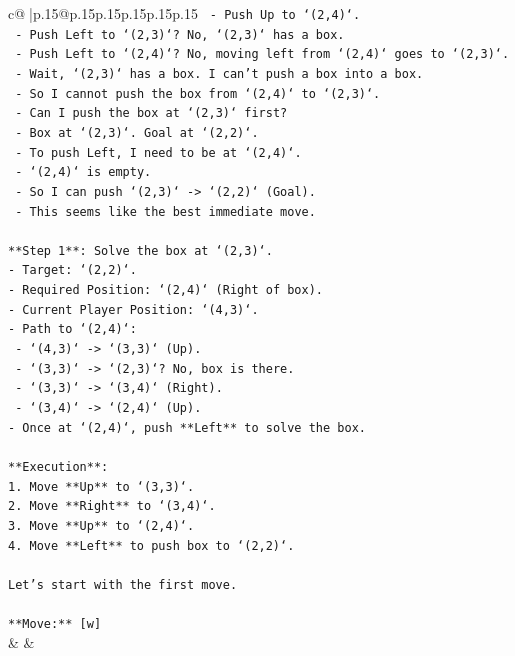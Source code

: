 \documentclass{article}
\begin{document}
{\begin{supertabular}{c@{$\;$}|p{.15\linewidth}@{}p{.15\linewidth}p{.15\linewidth}p{.15\linewidth}p{.15\linewidth}p{.15\linewidth}}
{{{\texttt{      {-} Push Up to `(2,4)`.} \\
\texttt{      {-} Push Left to `(2,3)`? No, `(2,3)` has a box.} \\
\texttt{      {-} Push Left to `(2,4)`? No, moving left from `(2,4)` goes to `(2,3)`.} \\
\texttt{      {-} Wait, `(2,3)` has a box. I can't push a box into a box.} \\
\texttt{      {-} So I cannot push the box from `(2,4)` to `(2,3)`.} \\
\texttt{      {-} Can I push the box at `(2,3)` first?} \\
\texttt{        {-} Box at `(2,3)`. Goal at `(2,2)`.} \\
\texttt{        {-} To push Left, I need to be at `(2,4)`.} \\
\texttt{        {-} `(2,4)` is empty.} \\
\texttt{        {-} So I can push `(2,3)` {-}> `(2,2)` (Goal).} \\
\texttt{        {-} This seems like the best immediate move.} \\
\\ 
\texttt{**Step 1**: Solve the box at `(2,3)`.} \\
\texttt{{-} Target: `(2,2)`.} \\
\texttt{{-} Required Position: `(2,4)` (Right of box).} \\
\texttt{{-} Current Player Position: `(4,3)`.} \\
\texttt{{-} Path to `(2,4)`:} \\
\texttt{  {-} `(4,3)` {-}> `(3,3)` (Up).} \\
\texttt{  {-} `(3,3)` {-}> `(2,3)`? No, box is there.} \\
\texttt{  {-} `(3,3)` {-}> `(3,4)` (Right).} \\
\texttt{  {-} `(3,4)` {-}> `(2,4)` (Up).} \\
\texttt{{-} Once at `(2,4)`, push **Left** to solve the box.} \\
\\ 
\texttt{**Execution**:} \\
\texttt{1.  Move **Up** to `(3,3)`.} \\
\texttt{2.  Move **Right** to `(3,4)`.} \\
\texttt{3.  Move **Up** to `(2,4)`.} \\
\texttt{4.  Move **Left** to push box to `(2,2)`.} \\
\\ 
\texttt{Let's start with the first move.} \\
\\ 
\texttt{**Move:** {[}w{]}} \\
            }
        }
    }
    & & \\ \\


\end{supertabular}}
\end{document}
